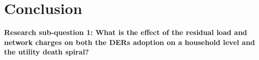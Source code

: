 \chapter{Conclusion}
\textbf{Research sub-question 1: What is the effect of the residual load and network charges on both the DERs adoption on a household level and the utility death spiral?}
\newline \newline \noindent
